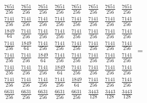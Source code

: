 \documentclass{article}
\begin{document}
$\allowbreak 
\begin{array}{cccccccc}
\frac{7651}{256} & \frac{7651}{256} & \frac{7651}{256} & \frac{7651}{256} & 
\frac{7651}{256} & \frac{7651}{256} & \frac{7651}{256} & \frac{7651}{256} \\ 
\frac{7141}{256} & \frac{7141}{256} & \frac{7141}{256} & \frac{7141}{256} & 
\frac{7141}{256} & \frac{7141}{256} & \frac{7141}{256} & \frac{7141}{256} \\ 
\frac{1849}{64} & \frac{7141}{256} & \frac{7141}{256} & \frac{7141}{256} & 
\frac{7141}{256} & \frac{7141}{256} & \frac{7141}{256} & \frac{7141}{256} \\ 
\frac{7141}{256} & \frac{1849}{64} & \frac{7141}{256} & \frac{7141}{256} & 
\frac{7141}{256} & \frac{7141}{256} & \frac{7141}{256} & \frac{7141}{256} \\ 
\frac{7141}{256} & \frac{7141}{256} & \frac{1849}{64} & \frac{7141}{256} & 
\frac{7141}{256} & \frac{7141}{256} & \frac{7141}{256} & \frac{7141}{256} \\ 
\frac{7141}{256} & \frac{7141}{256} & \frac{7141}{256} & \frac{1849}{64} & 
\frac{7141}{256} & \frac{7141}{256} & \frac{7141}{256} & \frac{7141}{256} \\ 
\frac{7141}{256} & \frac{7141}{256} & \frac{7141}{256} & \frac{7141}{256} & 
\frac{1849}{64} & \frac{7141}{256} & \frac{7141}{256} & \frac{7141}{256} \\ 
\frac{6631}{256} & \frac{6631}{256} & \frac{6631}{256} & \frac{6631}{256} & 
\frac{6631}{256} & \frac{3443}{128} & \frac{3443}{128} & \frac{3443}{128}
\end{array}
\allowbreak =$
\end{document}
